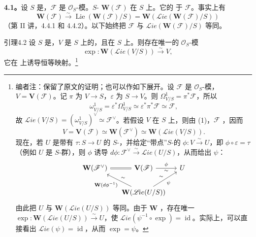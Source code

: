 \textbf{4.1。}设 $S$ 是，$\mathscr F$ 是 $\mathscr O_S$-模。$S$- $\mathbf W(\mathscr F)$ 在 $S$ 上。它的 于 $\mathscr F$。事实上有
\[
\mathbf W(\mathscr F)\xrightarrow{\sim}\operatorname{Lie}(\mathbf W(\mathscr F)/S)=\mathbf W(\mathscr{L}\!ie(\mathbf W(\mathscr F)/S))
\]
（第 II 讲，4.4.1 和 4.4.2）。以下始终把 $\mathscr F$ 与 $\mathscr{L}\!ie(\mathbf W(\mathscr F)/S)$ 等同。
\begin{SGAresult}{引理}{4.2}
设 $S$ 是，$V$ 是 $S$ 上的，且在 $S$ 上。则存在唯一的 $\mathscr O_S$-模
\[
\exp:\mathbf W(\mathscr{L}\!ie(V/S))\xrightarrow{\sim}V,
\]
它在 上诱导恒等映射。\footnote[31]{编者注：保留了原文的证明；也可以作如下展开。设 $\mathscr F$ 是 $\mathscr O_S$-模，$V=\mathbf V(\mathscr F)$。记 $\pi$ 为 $V\to S$，$\varepsilon$ 为 $S\to V$。则 $\Omega^1_{V/S}=\pi^*\mathscr F$，所以
\begin{equation}
\omega^1_{V/S}=\varepsilon^*\Omega^1_{V/S}\simeq\varepsilon^*\pi^*\mathscr F\simeq\mathscr F,\tag{1}
\end{equation}
故 $\mathscr{L}\!ie(V/S)=(\omega^1_{V/S})^\vee\simeq\mathscr F^\vee$。若假设 $V$ 在 $S$ 上，则由 (1)，$\mathscr F$ ，因而
\begin{equation}
V=\mathbf V(\mathscr F)\simeq\mathbf W(\mathscr F^\vee)\simeq\mathbf W(\mathscr{L}\!ie(V/S)).\tag{2}
\end{equation}
现在，若 $U$ 是带有 $\tau:S\to U$ 的 $S$-，并给定“带点”$S$-的 $\phi:V\xrightarrow{\sim}U$，即 $\phi\circ\varepsilon=\tau$（例如 $U$ 是 $S$-群），则 $\phi$ 诱导 $d\phi:\mathscr F^\vee\xrightarrow{\sim}\mathscr{L}\!ie(U/S)$，从而给出 $\psi$：
\[
\begin{tikzcd}[ampersand replacement=\&,column sep=small]
\mathbf W(\mathscr F^\vee)\arrow[r,equal]\&\mathbf V(\mathscr F)\arrow[r,"\phi","\sim"']\&U\\
\&\mathbf W(\mathscr{L}\!ie(U/S))\arrow[ul,"{\mathbf W(d\phi^{-1})}","\sim"']\arrow[ur,"\psi"',"\sim"]\&
\end{tikzcd}
\]
由此把 $U$ 与 $\mathbf W(\mathscr{L}\!ie(U/S))$ 等同。由于 $\mathbf W$ ，存在唯一 $\exp:\mathbf W(\mathscr{L}\!ie(U/S))\xrightarrow{\sim}U$，使 $\mathscr{L}\!ie(\psi^{-1}\circ\exp)=\operatorname{id}$。实际上，可以直接看出 $\mathscr{L}\!ie(\psi)=\operatorname{id}$，从而 $\exp=\psi$。}
\end{SGAresult}
